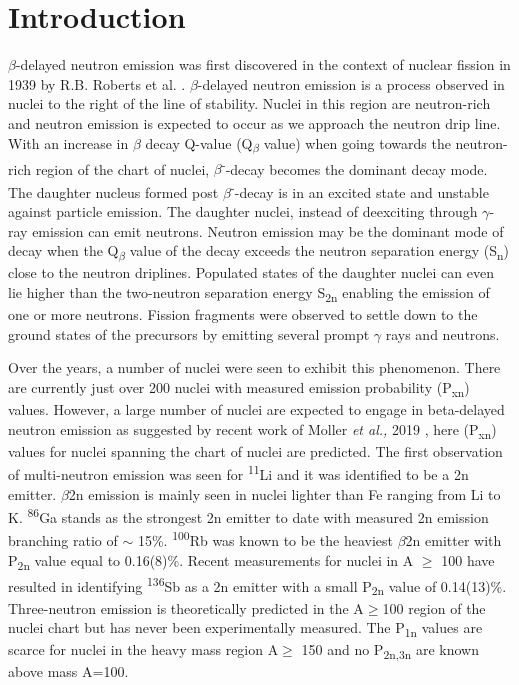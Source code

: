 \documentclass[a4paper,12pt,twoside]{report}
\begin{document}
\chapter{Introduction}
$\beta$-delayed neutron emission was first discovered in the context of nuclear fission in 1939 by R.B. Roberts et al. \cite{robert1939}. $\beta$-delayed neutron emission is a process observed in nuclei to the right of the line of stability. Nuclei in this region are neutron-rich and neutron emission is expected to occur as we approach the neutron drip line. With an increase in $\beta$ decay Q-value (Q{\textsubscript{$\beta$}} value) when going towards the neutron-rich region of the chart of nuclei, $\beta$\textsuperscript{-}-decay becomes the dominant decay mode. The daughter nucleus formed post $\beta$\textsuperscript{-}-decay is in an excited state and unstable against particle emission. The daughter nuclei, instead of deexciting through $\gamma$-ray emission can emit neutrons. Neutron emission may be the dominant mode of decay when the Q{\textsubscript{$\beta$}} value of the decay exceeds the neutron separation energy (S\textsubscript{n}) close to the neutron driplines. Populated states of the daughter nuclei can even lie higher than the two-neutron separation energy S\textsubscript{2n} enabling the emission of one or more neutrons. Fission fragments were observed to settle down to the ground states of the precursors by emitting several prompt $\gamma$ rays and neutrons.  

Over the years, a number of nuclei were seen to exhibit this phenomenon. There are currently just over 200 nuclei with measured emission probability (P\textsubscript{xn}) values. However, a large number of nuclei are expected to engage in beta-delayed neutron emission as suggested by recent work of Moller \textit{et al.,} 2019 \cite{MOLLER20191}, here (P\textsubscript{xn}) values for nuclei spanning the chart of nuclei are predicted. The first observation of multi-neutron emission was seen for \textsuperscript{11}Li and it was identified to be a 2n emitter. $\beta$2n emission is mainly seen in nuclei lighter than Fe ranging from Li to K. \textsuperscript{86}Ga \cite{Yokoyama2018, 86Ga} stands as the strongest 2n emitter to date with measured 2n emission branching ratio of $\sim$ 15\%. \textsuperscript{100}Rb was known to be the heaviest $\beta$2n emitter with P\textsubscript{2n} value equal to 0.16(8)\%. Recent measurements for nuclei in A $\geq$ 100 have resulted in identifying \textsuperscript{136}Sb as a 2n emitter with a small P\textsubscript{2n} value of 0.14(13)\%. Three-neutron emission is theoretically predicted in the A$\geq$100 region of the nuclei chart \cite{MOLLER20191} but has never been experimentally measured. The P\textsubscript{1n} values are scarce for nuclei in the heavy mass region A$\geq$ 150 and no P\textsubscript{2n,3n} are known above mass A=100. 
\end{document}
